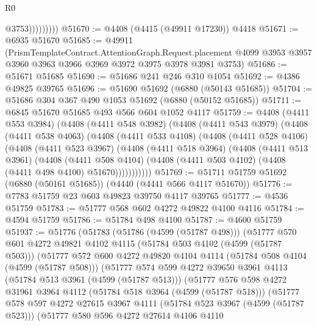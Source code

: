 \begin{lexlean}{R0}
\begin{coremodule}
                      @3753)))))))))
@51670 := @4408 (@4415 (@49911 @17230)) @4418
@51671 := @6935 @51670
@51685 := @49911
    (PrismTemplateContract.AttentionGraph.Request.placement
      @4099
      @3953
      @3957
      @3960
      @3963
      @3966
      @3969
      @3972
      @3975
      @3978
      @3981
      @3753)
@51686 := @51671 @51685
@51690 := @51686 @241 @246 @310 @1054
@51692 := @4386 @49825 @39765
@51696 := @51690 @51692 (@6880 (@50143 @51685))
@51704 := @51686 @304 @367 @490 @1053 @51692 (@6880 (@50152 @51685))
@51711 := @6845 @51670 @51685 @493 @566 @604 @1052 @4117
@51759 := @4408
    (@4411 @553 @3984)
    (@4408
      (@4411 @548 @3982)
      (@4408
        (@4411 @543 @3979)
        (@4408
          (@4411 @538 @4063)
          (@4408
            (@4411 @533 @4108)
            (@4408
              (@4411 @528 @4106)
              (@4408
                (@4411 @523 @3967)
                (@4408
                  (@4411 @518 @3964)
                  (@4408
                    (@4411 @513 @3961)
                    (@4408
                      (@4411 @508 @4104)
                      (@4408 (@4411 @503 @4102) (@4408 (@4411 @498 @4100) @51670)))))))))))
@51769 := @51711 @51759 @51692 (@6880 (@50161 @51685)) (@4440 (@4441 @566 @4117 @51670))
@51776 := @7783 @51759 @23 @603 @49823 @39750 @4117 @39765
@51777 := @4536 @51759
@51783 := @51777 @568 @602 @4272 @49822 @4100 @4116
@51784 := @4594 @51759
@51786 := @51784 @498 @4100
@51787 := @4600 @51759
@51937 := @51776
    (@51783
      (@51786 (@4599 (@51787 @498)))
      (@51777
        @570
        @601
        @4272
        @49821
        @4102
        @4115
        (@51784 @503 @4102 (@4599 (@51787 @503)))
        (@51777
          @572
          @600
          @4272
          @49820
          @4104
          @4114
          (@51784 @508 @4104 (@4599 (@51787 @508)))
          (@51777
            @574
            @599
            @4272
            @39650
            @3961
            @4113
            (@51784 @513 @3961 (@4599 (@51787 @513)))
            (@51777
              @576
              @598
              @4272
              @31961
              @3964
              @4112
              (@51784 @518 @3964 (@4599 (@51787 @518)))
              (@51777
                @578
                @597
                @4272
                @27615
                @3967
                @4111
                (@51784 @523 @3967 (@4599 (@51787 @523)))
                (@51777
                  @580
                  @596
                  @4272
                  @27614
                  @4106
                  @4110

\end{coremodule}
\end{lexlean}
